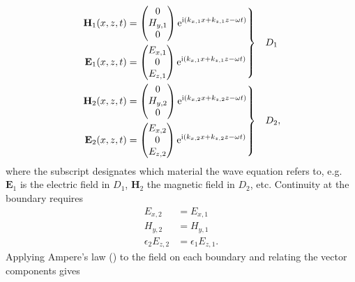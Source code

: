 \begin{align}
\left.\begin{aligned}
\mathbf{H}_1(x,z,t) &=
\begin{pmatrix}
0\\
H_{y,1}\\
0
\end{pmatrix} {\mathrm{e}}^{{\mathrm{i}}(k_{x,1}x+k_{z,1}z-\omega t)}\\
\mathbf{E}_1(x,z,t) &=
\begin{pmatrix}
E_{x,1}\\
0\\
E_{z,1}\\
\end{pmatrix} {\mathrm{e}}^{{\mathrm{i}}(k_{x,1}x+k_{z,1}z-\omega t)}
\end{aligned}
\right\}& \quad D_1\label{eqn:planewavedielectric}\\
\left.\begin{aligned}
\mathbf{H}_2(x,z,t) &=
\begin{pmatrix}
0\\
H_{y,2}\\
0
\end{pmatrix}
{\mathrm{e}}^{{\mathrm{i}}(k_{x,2}x+k_{z,2}z-\omega t)}\\
\mathbf{E}_2(x,z,t) &=
\begin{pmatrix}
E_{x,2}\\
0\\
E_{z,2}\\
\end{pmatrix}
{\mathrm{e}}^{{\mathrm{i}}(k_{x,2}x+k_{z,2}z-\omega t)}
\end{aligned}
\right\}&\quad D_2,
\label{eqn:planewavemetal}
\end{align}
where the subscript designates which material the wave equation refers to,
e.g.\ $\mathbf{E}_1$ is the electric field in $D_1$, $\mathbf{H}_2$
the magnetic field in $D_2$, etc. Continuity at the boundary
requires
\begin{align}
E_{x,2}&=E_{x,1}\\
H_{y,2}&=H_{y,1}\\
\epsilon_2 E_{z,2}&=\epsilon_1 E_{z,1}.
\end{align}
Applying Ampere's law () to the field on
each boundary and relating the vector components gives
